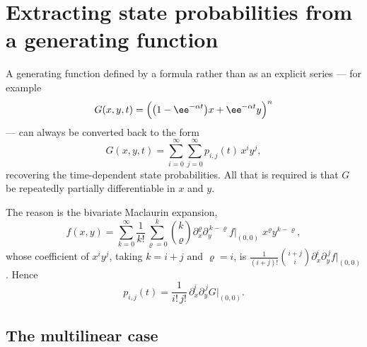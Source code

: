 \section{Extracting state probabilities from a generating function}
\label{app:extract}

A generating function defined by a formula rather than as an explicit series --- for
example
\begin{equation}
\label{eq:examplePgf}
G(x,y,t) = \Bigl(\bigl(1-\ee^{-\alpha t}\bigr)x + \ee^{-\alpha t}y\Bigr)^n
\end{equation}
--- can always be converted back to the form
\begin{equation}
\label{eq:series1}
G(x,y,t) = \sum_{i=0}^{\infty}\sum_{j=0}^{\infty}p_{i,j}(t)\,x^iy^j ,
\end{equation}
recovering the time-dependent state probabilities. All that is required is that $G$
be repeatedly partially differentiable in $x$ and $y$.

The reason is the bivariate Maclaurin expansion,
\begin{equation*}
f(x,y) = \sum_{k=0}^{\infty}\frac{1}{k!}\sum_{\varrho=0}^{k}\binom{k}{\varrho}
\partial_x^{\varrho}\partial_y^{\,k-\varrho}f\Big|_{(0,0)}\;x^{\varrho}y^{k-\varrho},
\end{equation*}
whose coefficient of $x^iy^j$, taking $k=i+j$ and $\varrho=i$, is
$\frac{1}{(i+j)!}\binom{i+j}{i}\partial_x^i\partial_y^{\,j}f\big|_{(0,0)}$. Hence
\begin{equation}
\label{eq:stateProb}
p_{i,j}(t) = \frac{1}{i!\,j!}\,\partial_x^i\partial_y^{\,j}G\Big|_{(0,0)} .
\end{equation}

\subsection*{The multilinear case}

